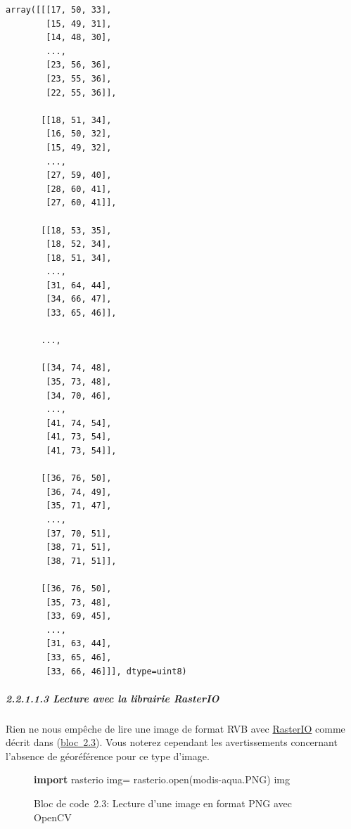 \documentclass[
]{article}
\newenvironment{Shaded}{}{}
\newcommand{\BuiltInTok}[1]{\textcolor[rgb]{0.00,0.50,0.00}{#1}}
\newcommand{\ImportTok}[1]{\textcolor[rgb]{0.00,0.50,0.00}{\textbf{#1}}}
\newcommand{\NormalTok}[1]{#1}
\newcommand{\OperatorTok}[1]{\textcolor[rgb]{0.40,0.40,0.40}{#1}}
\newcommand{\StringTok}[1]{\textcolor[rgb]{0.25,0.44,0.63}{#1}}
\begin{document}
\begin{verbatim}
array([[[17, 50, 33],
        [15, 49, 31],
        [14, 48, 30],
        ...,
        [23, 56, 36],
        [23, 55, 36],
        [22, 55, 36]],

       [[18, 51, 34],
        [16, 50, 32],
        [15, 49, 32],
        ...,
        [27, 59, 40],
        [28, 60, 41],
        [27, 60, 41]],

       [[18, 53, 35],
        [18, 52, 34],
        [18, 51, 34],
        ...,
        [31, 64, 44],
        [34, 66, 47],
        [33, 65, 46]],

       ...,

       [[34, 74, 48],
        [35, 73, 48],
        [34, 70, 46],
        ...,
        [41, 74, 54],
        [41, 73, 54],
        [41, 73, 54]],

       [[36, 76, 50],
        [36, 74, 49],
        [35, 71, 47],
        ...,
        [37, 70, 51],
        [38, 71, 51],
        [38, 71, 51]],

       [[36, 76, 50],
        [35, 73, 48],
        [33, 69, 45],
        ...,
        [31, 63, 44],
        [33, 65, 46],
        [33, 66, 46]]], dtype=uint8)
\end{verbatim}

\subparagraph{\texorpdfstring{{2.2.1.1.3} Lecture avec la librairie
RasterIO}{2.2.1.1.3 Lecture avec la librairie RasterIO}}\label{lecture-avec-la-librairie-rasterio}

Rien ne nous empêche de lire une image de format RVB avec
\href{https://rasterio.readthedocs.io/en/stable/}{RasterIO} comme décrit
dans (\hyperref[lst-lecturerasterioPNG]{bloc~{2.3}}). Vous noterez
cependant les avertissements concernant l'absence de géoréférence pour
ce type d'image.

\label{26176f8f}
\label{lst-lecturerasterioPNG}
\begin{figure}
\centering
{}\label{lst-lecturerasterioPNG}
\begin{Shaded}
\begin{Highlighting}[]
\ImportTok{import}\NormalTok{ rasterio}
\NormalTok{img}\OperatorTok{=}\NormalTok{ rasterio.}\BuiltInTok{open}\NormalTok{(}\StringTok{\textquotesingle{}modis{-}aqua.PNG\textquotesingle{}}\NormalTok{)}
\NormalTok{img}
\end{Highlighting}
\end{Shaded}
\caption{Bloc de code~2.3: Lecture d'une image en format PNG avec
OpenCV}
\end{figure}
\end{document}

